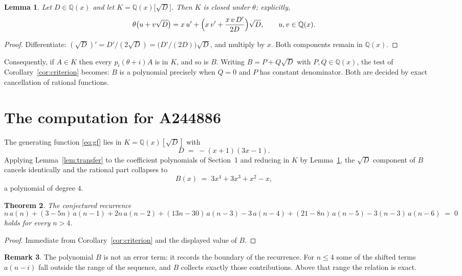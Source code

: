 \documentclass[11pt,a4paper]{article}
\theoremstyle{plain}
\newtheorem{theorem}{Theorem}
\newtheorem{lemma}[theorem]{Lemma}
\theoremstyle{definition}
\newtheorem{remark}[theorem]{Remark}
\begin{document}
\begin{lemma}\label{lem:field}
Let $D\in\mathbb{Q}(x)$ and let $K=\mathbb{Q}(x)\bigl[\sqrt{D}\bigr]$. Then $K$ is closed
under $\theta$; explicitly,
\[
\theta\bigl(u+v\sqrt{D}\bigr)=x\,u'+\Bigl(x\,v'+\frac{x\,v\,D'}{2D}\Bigr)\sqrt{D},
\qquad u,v\in\mathbb{Q}(x).
\]
\end{lemma}

\begin{proof}
Differentiate: $(\sqrt{D})'=D'/(2\sqrt{D})=\bigl(D'/(2D)\bigr)\sqrt{D}$, and multiply by
$x$. Both components remain in $\mathbb{Q}(x)$.
\end{proof}

Consequently, if $A\in K$ then every $p_{i}(\theta+i)A$ is in $K$, and so is $B$. Writing
$B=P+Q\sqrt{D}$ with $P,Q\in\mathbb{Q}(x)$, the test of Corollary~\ref{cor:criterion}
becomes: $B$ is a polynomial precisely when $Q=0$ and $P$ has constant denominator. Both
are decided by exact cancellation of rational functions.

\section{The computation for A244886}

The generating function \eqref{eq:gf} lies in $K=\mathbb{Q}(x)[\sqrt{D}]$ with
\[
D \;=\; - \left(x + 1\right) \left(3 x - 1\right) .
\]
Applying Lemma~\ref{lem:transfer} to the coefficient polynomials of Section~1 and reducing
in $K$ by Lemma~\ref{lem:field}, the $\sqrt{D}$ component of $B$ cancels identically and
the rational part collapses to
\[
B(x)\;=\;3 x^{4} + 3 x^{3} + x^{2} - x ,
\]
a polynomial of degree $4$.

\begin{theorem}
The conjectured recurrence
\[
n\,a(n) + (3 - 5 n)\,a(n-1) + 2 n\,a(n-2) + (13 n - 30)\,a(n-3) - 3\,a(n-4) + (21 - 8 n)\,a(n-5) -  3 \left(n - 3\right)\,a(n-6) \;=\;0
\]
holds for every $n>4$.
\end{theorem}

\begin{proof}
Immediate from Corollary~\ref{cor:criterion} and the displayed value of $B$.
\end{proof}

\begin{remark}
The polynomial $B$ is not an error term: it records the boundary of the recurrence. For
$n\le4$ some of the shifted terms $a(n-i)$ fall outside the range of the sequence,
and $B$ collects exactly those contributions. Above that range the relation is exact.
\end{remark}
\end{document}
